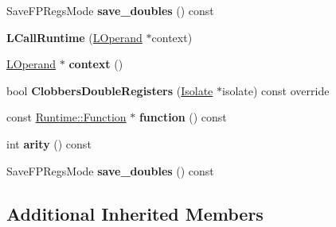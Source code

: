 \begin{DoxyCompactItemize}
\item 
Save\+F\+P\+Regs\+Mode {\bfseries save\+\_\+doubles} () const \hypertarget{classv8_1_1internal_1_1_l_call_runtime_abaa882f65ae172f9475a0ae3ff632509}{}\label{classv8_1_1internal_1_1_l_call_runtime_abaa882f65ae172f9475a0ae3ff632509}

\item 
{\bfseries L\+Call\+Runtime} (\hyperlink{classv8_1_1internal_1_1_l_operand}{L\+Operand} $\ast$context)\hypertarget{classv8_1_1internal_1_1_l_call_runtime_a0944b0ab9e1843075170591acb313644}{}\label{classv8_1_1internal_1_1_l_call_runtime_a0944b0ab9e1843075170591acb313644}

\item 
\hyperlink{classv8_1_1internal_1_1_l_operand}{L\+Operand} $\ast$ {\bfseries context} ()\hypertarget{classv8_1_1internal_1_1_l_call_runtime_a53d124954c165c48517bcb9163072229}{}\label{classv8_1_1internal_1_1_l_call_runtime_a53d124954c165c48517bcb9163072229}

\item 
bool {\bfseries Clobbers\+Double\+Registers} (\hyperlink{classv8_1_1internal_1_1_isolate}{Isolate} $\ast$isolate) const  override\hypertarget{classv8_1_1internal_1_1_l_call_runtime_a4bf2712add569c33e2d6106c63c0f1ff}{}\label{classv8_1_1internal_1_1_l_call_runtime_a4bf2712add569c33e2d6106c63c0f1ff}

\item 
const \hyperlink{structv8_1_1internal_1_1_runtime_1_1_function}{Runtime\+::\+Function} $\ast$ {\bfseries function} () const \hypertarget{classv8_1_1internal_1_1_l_call_runtime_ac92d3ff58d96d75e965c38dbbc3ae1ee}{}\label{classv8_1_1internal_1_1_l_call_runtime_ac92d3ff58d96d75e965c38dbbc3ae1ee}

\item 
int {\bfseries arity} () const \hypertarget{classv8_1_1internal_1_1_l_call_runtime_a48b7ab12a64bdad01522b517180dc1f9}{}\label{classv8_1_1internal_1_1_l_call_runtime_a48b7ab12a64bdad01522b517180dc1f9}

\item 
Save\+F\+P\+Regs\+Mode {\bfseries save\+\_\+doubles} () const \hypertarget{classv8_1_1internal_1_1_l_call_runtime_abaa882f65ae172f9475a0ae3ff632509}{}\label{classv8_1_1internal_1_1_l_call_runtime_abaa882f65ae172f9475a0ae3ff632509}

\end{DoxyCompactItemize}
\subsection*{Additional Inherited Members}


